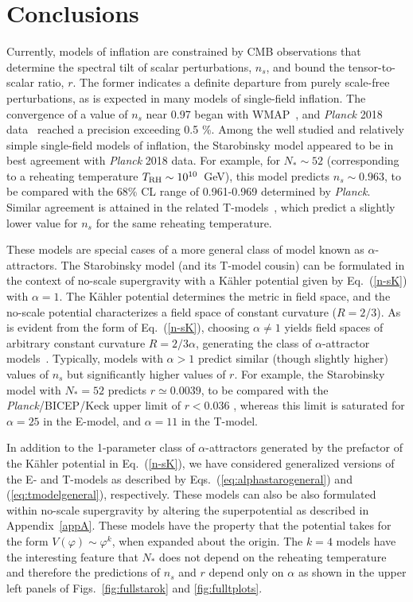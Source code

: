 \documentclass[aps,prev,twocolumn,preprintnumbers,floatfix,nofootinbib]{revtex4-1}
\newcommand{\trh}{T_{\rm RH}}
\begin{document}
\section{Conclusions}
\label{sec:conclusions}

Currently, models of inflation are constrained by CMB observations that determine the spectral tilt of scalar perturbations, $n_s$, and bound the tensor-to-scalar ratio, $r$. The former indicates a definite departure from purely scale-free perturbations, as is expected in many models of single-field inflation. The convergence of a value of $n_s$ near 0.97 began with WMAP~\cite{wmap}, and {\it Planck} 2018 data~\cite{Planck} reached a precision exceeding 0.5 \%. Among the well studied and relatively simple single-field models of inflation, the Starobinsky model \cite{Staro} appeared to be in best agreement with {\it Planck} 2018 data. For example, for $N_* \sim 52$ (corresponding to a reheating temperature $\trh \sim 10^{10}$~GeV), this model predicts $n_s \sim 0.963$, to be compared with the 68\% CL range of 0.961-0.969 determined by {\it Planck}. Similar agreement is attained in the related T-models~\cite{Carrasco:2015rva},
which predict a slightly lower value for $n_s$ for the same reheating temperature. 

These models are special cases of a more general class of model known as $\alpha$-attractors. The Starobinsky model (and its T-model cousin) can be formulated in the context of no-scale supergravity \cite{ENO6,Cecotti,GKMO} with a K\"ahler potential given by Eq.~(\ref{n-sK}) with $\alpha = 1$. The K\"ahler potential determines the metric in field space, and the no-scale potential characterizes a field space of constant curvature ($R = 2/3$). As is evident from the form of Eq.~(\ref{n-sK}), choosing $\alpha \ne 1$ yields field spaces of arbitrary constant curvature $R = 2/3\alpha$, generating the class of $\alpha$-attractor models~\cite{ENO7,Kallosh:2013hoa,T-model,KLR}. Typically, models with $\alpha > 1$ predict similar (though slightly higher) values of $n_s$
but significantly higher values of $r$. For example, the Starobinsky model with $N_* = 52$
predicts $r \simeq 0.0039$, to be compared with the {\it Planck}/BICEP/Keck upper limit of $r < 0.036$ \cite{BICEP2021}, whereas this limit is saturated for $\alpha = 25$ in the E-model, and $\alpha = 11$ in the T-model.

In addition to the 1-parameter class of $\alpha$-attractors generated by the prefactor of the K\"ahler potential in Eq.~(\ref{n-sK}),
we have considered generalized versions of the E- and T-models as described by Eqs.~(\ref{eq:alphastarogeneral}) and (\ref{eq:tmodelgeneral}), respectively. These models can also be also formulated within no-scale supergravity by altering the superpotential as described in Appendix~\ref{appA}. 
These models have the property that the potential 
takes for the form $V(\varphi)\sim \varphi^k$, when expanded about the origin. 
The $k=4$ models have the interesting feature that $N_*$ does not depend on the reheating temperature and therefore the predictions of $n_s$ and $r$ depend only on $\alpha$ as shown in the upper left panels of Figs.~\ref{fig:fullstarok} and \ref{fig:fulltplots}.
\end{document}
